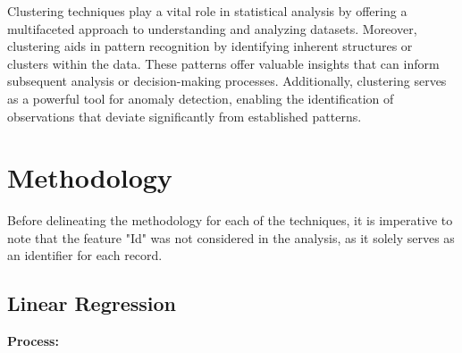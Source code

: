 \documentclass[conference]{IEEEtran}
\begin{document}
Clustering techniques play a vital role in statistical analysis by offering a multifaceted approach to understanding and analyzing datasets.
Moreover, clustering aids in pattern recognition by identifying inherent structures or clusters within the data. These patterns offer valuable insights that can inform subsequent analysis or decision-making processes.
Additionally, clustering serves as a powerful tool for anomaly detection, enabling the identification of observations that deviate significantly from established patterns.

\vspace{0.5cm}

\section{{Methodology}}
\vspace{0.2cm}
Before delineating the methodology for each of the techniques, it is imperative to note that the feature "Id" was not considered in the analysis, as it solely serves as an identifier for each record.

\subsection{Linear Regression}
\vspace{0.2cm}
\textbf{Process:}

\vspace{0.2cm}
\end{document}
